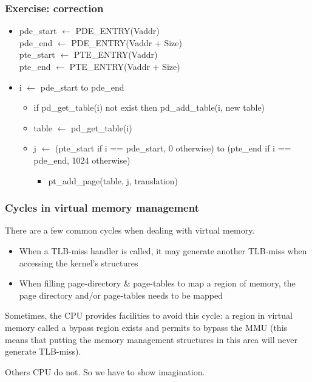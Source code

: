 \begin{frame}
  \frametitle{Exercise: correction}

  \begin{itemize}
  \item
    pde\_start $\leftarrow$ PDE\_ENTRY(Vaddr) \\
    pde\_end $\leftarrow$ PDE\_ENTRY(Vaddr + Size) \\
    pte\_start $\leftarrow$ PTE\_ENTRY(Vaddr) \\
    pte\_end $\leftarrow$ PTE\_ENTRY(Vaddr + Size)
  \item
    i $\leftarrow$ pde\_start to pde\_end
    \begin{itemize}
    \item
      if pd\_get\_table(i) not exist then pd\_add\_table(i, new table)
    \item
      table $\leftarrow$ pd\_get\_table(i)
    \item
      j $\leftarrow$ (pte\_start if i == pde\_start, 0 otherwise) to (pte\_end if i == pde\_end, 1024 otherwise)
      \begin{itemize}
      \item
        pt\_add\_page(table, j, translation)
      \end{itemize}
    \end{itemize}
  \end{itemize}

\end{frame}


\begin{frame}
  \frametitle{Cycles in virtual memory management}

  There are a few common cycles when dealing with virtual memory.

  \begin{itemize}
  \item
    When a TLB-miss handler is called, it may generate another
    TLB-miss when accessing the kernel's structures
  \item
    When filling page-directory \& page-tables to map a region of
    memory, the page directory and/or page-tables needs to be mapped
  \end{itemize}

  \-

  Sometimes, the CPU provides facilities to avoid this cycle: a region
  in virtual memory called a bypass region exists and permits to
  bypass the MMU (this means that putting the memory management
  structures in this area will never generate TLB-miss).

  \-

  Others CPU do not. So we have to show imagination.

\end{frame}


